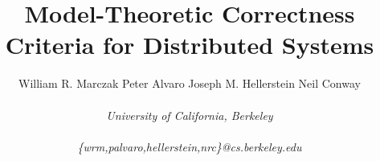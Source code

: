 \documentclass{sig-alternate}
\begin{document}
\title{Model-Theoretic Correctness Criteria for Distributed Systems}
%


\author{
%
William R. Marczak \quad Peter Alvaro \quad Joseph M. Hellerstein \quad Neil Conway
\\\\
%
\fontsize{10}{10}\selectfont\itshape 
University of California, Berkeley\\\\ \fontsize{9}{9}\selectfont\ttfamily\upshape
%
\{wrm,palvaro,hellerstein,nrc\}@cs.berkeley.edu
%
}

\toappear{}

\maketitle
\end{document}

